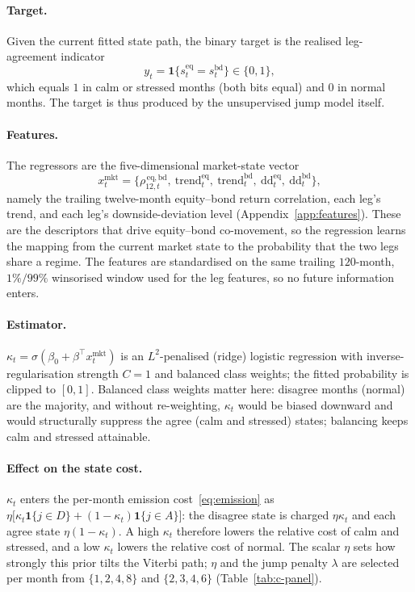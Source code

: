 \paragraph{Target.}
Given the current fitted state path, the binary target is the realised leg-agreement indicator
\[
y_t=\mathbf{1}\{s^{\mathrm{eq}}_t=s^{\mathrm{bd}}_t\}\in\{0,1\},
\]
which equals $1$ in calm or stressed months (both bits equal) and $0$ in normal months. The
target is thus produced by the unsupervised jump model itself.

\paragraph{Features.}
The regressors are the five-dimensional market-state vector
\[
x^{\mathrm{mkt}}_t=\big\{\rho^{\,\mathrm{eq,bd}}_{12,t},\
\mathrm{trend}^{\mathrm{eq}}_t,\ \mathrm{trend}^{\mathrm{bd}}_t,\
\mathrm{dd}^{\mathrm{eq}}_t,\ \mathrm{dd}^{\mathrm{bd}}_t\big\},
\]
namely the trailing twelve-month equity--bond return correlation, each leg's trend, and each
leg's downside-deviation level (Appendix~\ref{app:features}). These are the descriptors that drive
equity--bond co-movement, so the regression learns the mapping from the current market state to
the probability that the two legs share a regime. The features are standardised on the same
trailing $120$-month, $1\%/99\%$ winsorised window used for the leg features, so no future
information enters.

\paragraph{Estimator.}
$\kappa_t=\sigma(\beta_0+\beta^{\top}x^{\mathrm{mkt}}_t)$ is an $L^2$-penalised (ridge)
logistic regression with inverse-regularisation strength $C=1$
and balanced class weights; the fitted probability is clipped to $[0,1]$. 
Balanced class weights matter here: disagree months (normal) are the majority, and without re-weighting, 
$\kappa_t$ would be biased downward and
would structurally suppress the agree 
(calm and stressed) states; balancing keeps calm and stressed attainable.

\paragraph{Effect on the state cost.}
$\kappa_t$ enters the per-month emission cost~\eqref{eq:emission} as
$\eta\big[\kappa_t\mathbf{1}\{j\in D\}+(1-\kappa_t)\mathbf{1}\{j\in A\}\big]$: the disagree
state is charged $\eta\kappa_t$ and each agree state $\eta(1-\kappa_t)$. A high $\kappa_t$
therefore lowers the relative cost of calm and stressed, and a low $\kappa_t$ lowers the
relative cost of normal. The scalar $\eta$ sets how strongly this prior tilts the Viterbi path;
$\eta$ and the jump penalty $\lambda$ are selected per month from $\{1,2,4,8\}$ and
$\{2,3,4,6\}$ (Table~\ref{tab:c-panel}).

